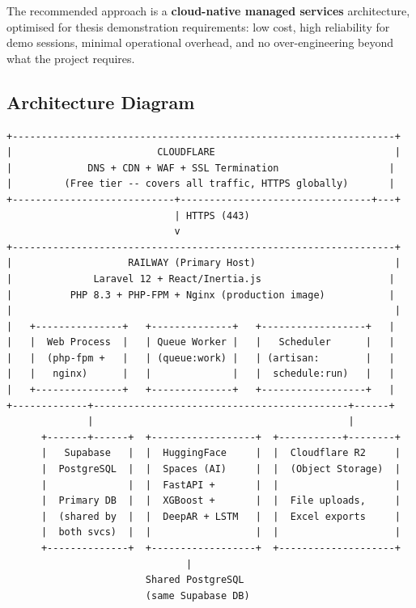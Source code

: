 \documentclass[12pt,a4paper]{report}
\begin{document}
The recommended approach is a \textbf{cloud-native managed services}
architecture, optimised for thesis demonstration requirements: low cost,
high reliability for demo sessions, minimal operational overhead, and
no over-engineering beyond what the project requires.

\subsection{Architecture Diagram}

\begin{lstlisting}[caption={High-Level Production Architecture}]
+------------------------------------------------------------------+
|                         CLOUDFLARE                               |
|             DNS + CDN + WAF + SSL Termination                   |
|         (Free tier -- covers all traffic, HTTPS globally)       |
+----------------------------+---------------------------------+---+
                             | HTTPS (443)
                             v
+------------------------------------------------------------------+
|                    RAILWAY (Primary Host)                        |
|              Laravel 12 + React/Inertia.js                      |
|          PHP 8.3 + PHP-FPM + Nginx (production image)           |
|                                                                  |
|   +---------------+   +--------------+   +------------------+   |
|   |  Web Process  |   | Queue Worker |   |   Scheduler      |   |
|   |  (php-fpm +   |   | (queue:work) |   | (artisan:        |   |
|   |   nginx)      |   |              |   |  schedule:run)   |   |
|   +---------------+   +--------------+   +------------------+   |
+-------------+--------------------------------------------+------+
              |                                            |
      +-------+------+  +------------------+  +-----------+--------+
      |   Supabase   |  |  HuggingFace     |  |  Cloudflare R2     |
      |  PostgreSQL  |  |  Spaces (AI)     |  |  (Object Storage)  |
      |              |  |  FastAPI +       |  |                    |
      |  Primary DB  |  |  XGBoost +       |  |  File uploads,     |
      |  (shared by  |  |  DeepAR + LSTM   |  |  Excel exports     |
      |  both svcs)  |  |                  |  |                    |
      +--------------+  +------------------+  +--------------------+
                               |
                        Shared PostgreSQL
                        (same Supabase DB)
\end{lstlisting}
\end{document}
